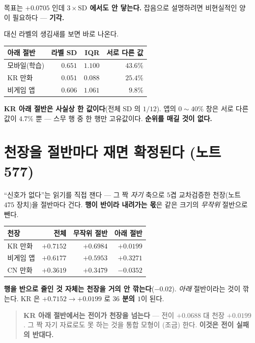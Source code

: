 \documentclass[11pt]{article}
\begin{document}
목표는 $+0.0705$ 인데 \textbf{$3 \times \mathrm{SD}$ 에서도 안 닿는다.}
잡음으로 설명하려면 비현실적인 양이 필요하다 --- \textbf{기각.}

대신 라벨의 생김새를 보면 바로 나온다.

\begin{center}
\begin{tabular}{lrrr}
\hline
아래 절반 & 라벨 SD & IQR & 서로 다른 값 \\
\hline
모바일(학습) & $0.651$ & $1.100$ & $43.6\%$ \\
KR 만화 & $\mathbf{0.051}$ & $\mathbf{0.088}$ & $25.4\%$ \\
비게임 앱 & $0.606$ & $1.061$ & $\mathbf{9.8\%}$ \\
\hline
\end{tabular}
\end{center}

\textbf{KR 아래 절반은 사실상 한 값이다}(전체 SD 의 $1/12$). 앱의
$0\!\sim\!40\%$ 창은 서로 다른 값이 \textbf{$4.7\%$} 뿐 --- 스무 행 중 한
행만 고유값이다. \textbf{순위를 매길 것이 없다.}

\section{천장을 절반마다 재면 확정된다 (노트 577)}

``신호가 없다''는 읽기를 직접 잰다 --- 그 짝 \emph{자기} 축으로 $5$겹
교차검증한 천장(노트 $475$ 장치)을 절반마다 건다. \textbf{행이 반이라
내려가는 몫}은 같은 크기의 \emph{무작위} 절반으로 뺀다.

\begin{center}
\begin{tabular}{lrrr}
\hline
천장 & 전체 & 무작위 절반 & \textbf{아래 절반} \\
\hline
KR 만화 & $+0.7152$ & $+0.6984$ & $\mathbf{+0.0199}$ \\
비게임 앱 & $+0.6177$ & $+0.5953$ & $+0.3271$ \\
CN 만화 & $+0.3619$ & $+0.3479$ & $\mathbf{-0.0352}$ \\
\hline
\end{tabular}
\end{center}

\textbf{행을 반으로 줄인 것 자체는 천장을 거의 안 깎는다}($-0.02$).
\emph{아래} 절반이라는 것이 깎는다. KR 은 $+0.7152 \to +0.0199$ 로
\textbf{$36$ 분의 $1$}이 된다.

\begin{quote}
\textbf{KR 아래 절반에서는 전이가 천장을 넘는다} --- 전이 $+0.0688$ 대
천장 $+0.0199$. 그 짝 자기 자료로도 못 하는 것을 통합 모형이 (조금) 한다.
\textbf{이것은 전이 실패의 반대다.}
\end{quote}
\end{document}
